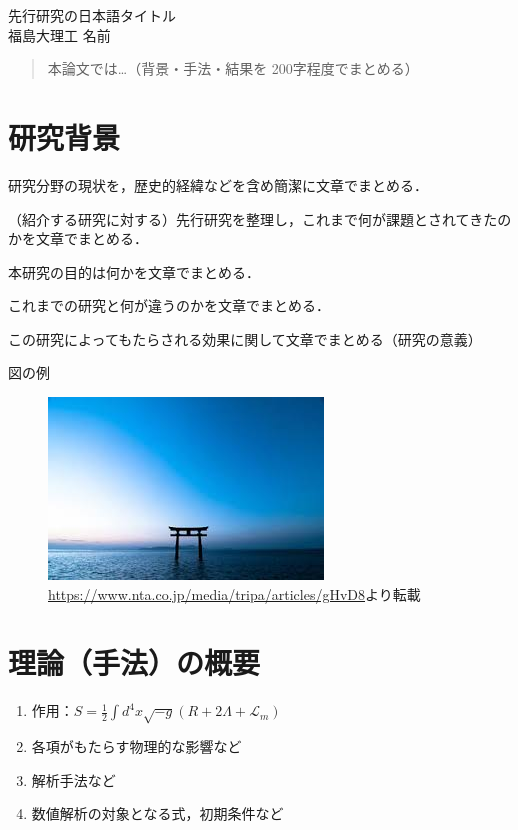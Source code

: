 \documentclass[12pt,a4paper]{jsarticle}
\begin{document}
\vspace{-5pt}
\begin{center}
{\gt \Large 先行研究の日本語タイトル\cite{G_ng_r_2021} }\\[14pt]

{\gt \large 福島大理工 名前}\\[5pt]

\end{center}

\vspace{10pt}

\begin{abstract}
    本論文では…（背景・手法・結果を 200字程度でまとめる）
\end{abstract}

\section{研究背景}
\begin{description}[leftmargin=*]
    \item[分野の状況] 研究分野の現状を，歴史的経緯などを含め簡潔に文章でまとめる．
    \item[分野の課題]（紹介する研究に対する）先行研究を整理し，これまで何が課題とされてきたのかを文章でまとめる．
    \item[研究の目的] 本研究の目的は何かを文章でまとめる．
    \item[新規性] これまでの研究と何が違うのかを文章でまとめる．
    \item[期待される効果] この研究によってもたらされる効果に関して文章でまとめる（研究の意義）
\end{description}
図の例
\begin{figure}[htbp]
    \centering
    \label{fig:research_goal}
    \includegraphics[width=0.5\linewidth]{./fig_1.png}
    \caption[転載元サイト]{\url{https://www.nta.co.jp/media/tripa/articles/gHvD8}より転載}
\end{figure}

\section{理論（手法）の概要}
\begin{enumerate}[leftmargin=*]
  \item 作用：$S = \frac{1}{2} \int d^4 x \sqrt{-g} \left( R + 2\Lambda + \mathcal{L}_m \right)$
  \item 各項がもたらす物理的な影響など
  \item 解析手法など
  \item 数値解析の対象となる式，初期条件など
\end{enumerate}
\end{document}
